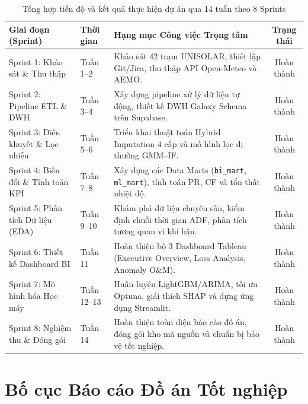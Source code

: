 \documentclass[12pt, a4paper]{report}
\begin{document}
\begin{table}[H]
\centering
\caption{Tổng hợp tiến độ và kết quả thực hiện dự án qua 14 tuần theo 8 Sprints}
\label{tab:project_timeline}
\small
\renewcommand{\arraystretch}{1.2}
\begin{tabularx}{\textwidth}{@{} l l X c @{}}
\toprule
\textbf{Giai đoạn (Sprint)} & \textbf{Thời gian} & \textbf{Hạng mục Công việc Trọng tâm} & \textbf{Trạng thái} \\
\midrule
Sprint 1: Khảo sát \& Thu thập & Tuần 1--2 & Khảo sát 42 trạm UNISOLAR, thiết lập Git/Jira, thu thập API Open-Meteo và AEMO. & Hoàn thành \\
Sprint 2: Pipeline ETL \& DWH & Tuần 3--4 & Xây dựng pipeline xử lý dữ liệu tự động, thiết kế DWH Galaxy Schema trên Supabase. & Hoàn thành \\
Sprint 3: Điền khuyết \& Lọc nhiễu & Tuần 5--6 & Triển khai thuật toán Hybrid Imputation 4 cấp và mô hình lọc dị thường GMM--IF. & Hoàn thành \\
Sprint 4: Biến đổi \& Tính toán KPI & Tuần 7--8 & Xây dựng các Data Marts (\texttt{bi\_mart}, \texttt{ml\_mart}), tính toán PR, CF và tổn thất nhiệt độ. & Hoàn thành \\
Sprint 5: Phân tích Dữ liệu (EDA) & Tuần 9--10 & Khám phá dữ liệu chuyên sâu, kiểm định chuỗi thời gian ADF, phân tích tương quan vi khí hậu. & Hoàn thành \\
Sprint 6: Thiết kế Dashboard BI & Tuần 11 & Hoàn thiện bộ 3 Dashboard Tableau (Executive Overview, Loss Analysis, Anomaly O\&M). & Hoàn thành \\
Sprint 7: Mô hình hóa Học máy & Tuần 12--13 & Huấn luyện LightGBM/ARIMA, tối ưu Optuna, giải thích SHAP và dựng ứng dụng Streamlit. & Hoàn thành \\
Sprint 8: Nghiệm thu \& Đóng gói & Tuần 14 & Hoàn thiện toàn diện báo cáo đồ án, đóng gói kho mã nguồn và chuẩn bị bảo vệ tốt nghiệp. & Hoàn thành \\
\bottomrule
\end{tabularx}


\end{table}

\newpage
\section{Bố cục Báo cáo Đồ án Tốt nghiệp}
\label{sec:bocuc}
\end{document}

